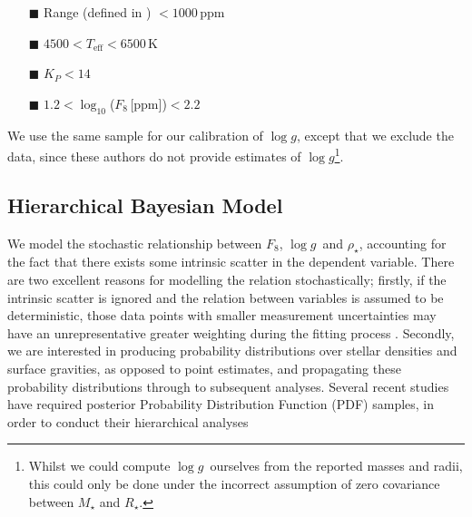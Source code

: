 \documentclass[apjl]{emulateapj}
\newcommand{\logg}{$\log g$}
\newcommand{\rhostar}{$\rho_{\star}$}
\begin{document}
\begin{itemize}
\item[{\tiny$\blacksquare$}] Range (defined in \citealt{bastien:2013})
$<1000$\,ppm
\item[{\tiny$\blacksquare$}] $4500<T_{\mathrm{eff}}<6500$\,K
\item[{\tiny$\blacksquare$}] $K_P<14$
\item[{\tiny$\blacksquare$}] $1.2 < \log_{10}$($F_8$\,[ppm])$< 2.2$
\end{itemize}

We use the same sample for our calibration of \logg, except that we exclude the
\citet{huber:2013} data, since these authors do not provide estimates of
\logg\footnote{Whilst we could compute \logg\ ourselves from the reported
masses and radii, this could only be done under the incorrect assumption of
zero covariance between $M_{\star}$ and $R_{\star}$.}.

\subsection{Hierarchical Bayesian Model}

We model the stochastic relationship between $F_8$, \logg\ and \rhostar,
accounting for the fact that there exists some intrinsic scatter in
the dependent variable.
There are two excellent reasons for modelling the relation stochastically;
firstly, if the intrinsic scatter is ignored and the relation between
variables is assumed to be deterministic, those data points with smaller
measurement uncertainties may have an unrepresentative greater weighting
during the fitting process \citep{hogg:2010b}.
Secondly, we are interested in producing probability distributions over
stellar densities and surface gravities, as opposed to point estimates, and
propagating these probability distributions through to subsequent analyses.
Several recent studies have required posterior Probability Distribution
Function (PDF) samples, in order to conduct their hierarchical analyses
\citep[e.g.][]{foreman-mackey:2014, rogers:2015, angus:2015}
\end{document}
